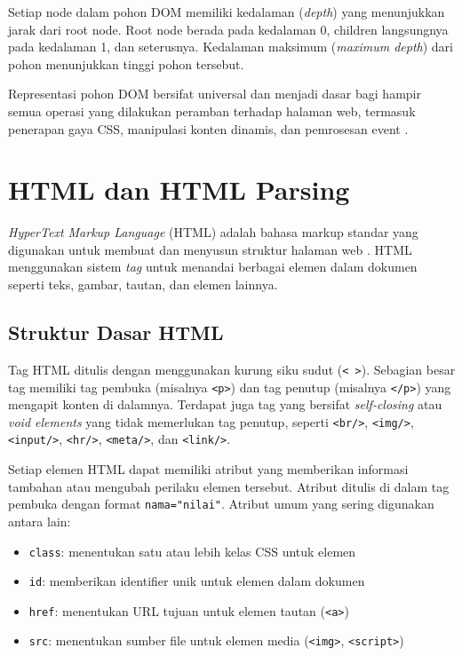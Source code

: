 Setiap node dalam pohon DOM memiliki kedalaman (\textit{depth}) yang menunjukkan
jarak dari root node. Root node berada pada kedalaman 0, children langsungnya
pada kedalaman 1, dan seterusnya. Kedalaman maksimum (\textit{maximum depth})
dari pohon menunjukkan tinggi pohon tersebut.

Representasi pohon DOM bersifat universal dan menjadi dasar bagi hampir semua
operasi yang dilakukan peramban terhadap halaman web, termasuk penerapan gaya
CSS, manipulasi konten dinamis, dan pemrosesan event \cite{flanagan2006javascript}.

\section{HTML dan HTML Parsing}

\textit{HyperText Markup Language} (HTML) adalah bahasa markup standar yang
digunakan untuk membuat dan menyusun struktur halaman web \cite{mdn_html}.
HTML menggunakan sistem \textit{tag} untuk menandai berbagai elemen dalam
dokumen seperti teks, gambar, tautan, dan elemen lainnya.

\subsection{Struktur Dasar HTML}

Tag HTML ditulis dengan menggunakan kurung siku sudut (\texttt{< >}). Sebagian
besar tag memiliki tag pembuka (misalnya \texttt{<p>}) dan tag penutup
(misalnya \texttt{</p>}) yang mengapit konten di dalamnya. Terdapat juga tag
yang bersifat \textit{self-closing} atau \textit{void elements} yang tidak
memerlukan tag penutup, seperti \texttt{<br/>}, \texttt{<img/>}, \texttt{<input/>},
\texttt{<hr/>}, \texttt{<meta/>}, dan \texttt{<link/>}.

Setiap elemen HTML dapat memiliki atribut yang memberikan informasi tambahan
atau mengubah perilaku elemen tersebut. Atribut ditulis di dalam tag pembuka
dengan format \texttt{nama="nilai"}. Atribut umum yang sering digunakan antara
lain:

\begin{itemize}
    \item \texttt{class}: menentukan satu atau lebih kelas CSS untuk elemen
    \item \texttt{id}: memberikan identifier unik untuk elemen dalam dokumen
    \item \texttt{href}: menentukan URL tujuan untuk elemen tautan (\texttt{<a>})
    \item \texttt{src}: menentukan sumber file untuk elemen media (\texttt{<img>},
    \texttt{<script>})
\end{itemize}


